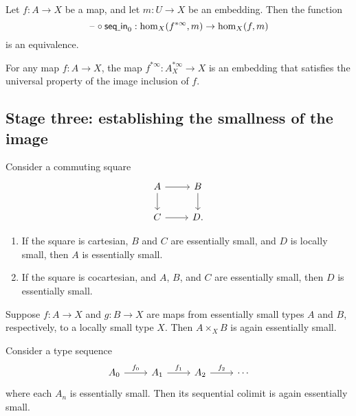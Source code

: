 \begin{lem}\label{lem:finfjp_up}
Let $f:A\to X$ be a map, and let $m:U\to X$ be an embedding. Then the function
\begin{equation*}
\mathord{\hspace{1pt}\text{--}\hspace{1pt}}\circ \mathsf{seq\underline{\ }{}in}_0: \mathrm{hom}_X(f^{\ast\infty},m)\to \mathrm{hom}_X(f,m)
\end{equation*}
is an equivalence. 
\end{lem}

\begin{thm}\label{thm:image}
For any map $f:A\to X$, the map $f^{\ast\infty}:A_X^{\ast\infty}\to X$ is an embedding that satisfies the universal property of the image inclusion of $f$.
\end{thm}

\subsection{Stage three: establishing the smallness of the image}
\begin{lem}
Consider a commuting square
\begin{equation*}
\begin{tikzcd}
A \arrow[r] \arrow[d] & B \arrow[d] \\
C \arrow[r] & D.
\end{tikzcd}
\end{equation*}
\begin{enumerate}
\item If the square is cartesian, $B$ and $C$ are essentially small, and $D$ is locally small, then $A$ is essentially small.
\item If the square is cocartesian, and $A$, $B$, and $C$ are essentially small, then $D$ is essentially small. 
\end{enumerate}
\end{lem}

\begin{cor}
Suppose $f:A\to X$ and $g:B\to X$ are maps from essentially small types $A$ and $B$, respectively, to a locally small type $X$. Then $A\times_X B$ is again essentially small. 
\end{cor}

\begin{lem}
Consider a type sequence
\begin{equation*}
\begin{tikzcd}
A_0 \arrow[r,"f_0"] & A_1 \arrow[r,"f_1"] & A_2 \arrow[r,"f_2"] & \cdots
\end{tikzcd}
\end{equation*}
where each $A_n$ is essentially small. Then its sequential colimit is again essentially small. 
\end{lem}

